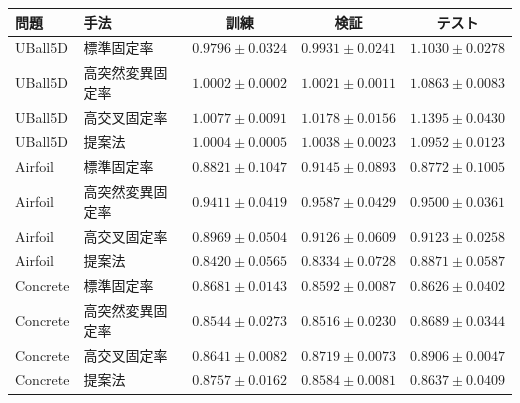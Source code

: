 \begin{tabular}{@{}llccc@{}}
\toprule
問題 & 手法 & 訓練 & 検証 & テスト \\
\midrule
UBall5D & 標準固定率 & \(0.9796\pm0.0324\) & \(0.9931\pm0.0241\) & \(1.1030\pm0.0278\) \\
UBall5D & 高突然変異固定率 & \(1.0002\pm0.0002\) & \(1.0021\pm0.0011\) & \(1.0863\pm0.0083\) \\
UBall5D & 高交叉固定率 & \(1.0077\pm0.0091\) & \(1.0178\pm0.0156\) & \(1.1395\pm0.0430\) \\
UBall5D & 提案法 & \(1.0004\pm0.0005\) & \(1.0038\pm0.0023\) & \(1.0952\pm0.0123\) \\
\addlinespace[2pt]
Airfoil & 標準固定率 & \(0.8821\pm0.1047\) & \(0.9145\pm0.0893\) & \(0.8772\pm0.1005\) \\
Airfoil & 高突然変異固定率 & \(0.9411\pm0.0419\) & \(0.9587\pm0.0429\) & \(0.9500\pm0.0361\) \\
Airfoil & 高交叉固定率 & \(0.8969\pm0.0504\) & \(0.9126\pm0.0609\) & \(0.9123\pm0.0258\) \\
Airfoil & 提案法 & \(0.8420\pm0.0565\) & \(0.8334\pm0.0728\) & \(0.8871\pm0.0587\) \\
\addlinespace[2pt]
Concrete & 標準固定率 & \(0.8681\pm0.0143\) & \(0.8592\pm0.0087\) & \(0.8626\pm0.0402\) \\
Concrete & 高突然変異固定率 & \(0.8544\pm0.0273\) & \(0.8516\pm0.0230\) & \(0.8689\pm0.0344\) \\
Concrete & 高交叉固定率 & \(0.8641\pm0.0082\) & \(0.8719\pm0.0073\) & \(0.8906\pm0.0047\) \\
Concrete & 提案法 & \(0.8757\pm0.0162\) & \(0.8584\pm0.0081\) & \(0.8637\pm0.0409\) \\
\bottomrule
\end{tabular}
